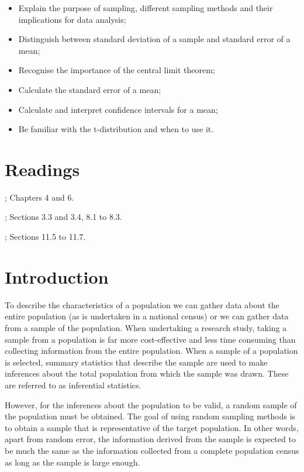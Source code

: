 \documentclass[
]{memoir}
\providecommand{\tightlist}{%
  \setlength{\itemsep}{0pt}\setlength{\parskip}{0pt}}
\begin{document}
\begin{itemize}
\tightlist
\item
  Explain the purpose of sampling, different sampling methods and their implications for data analysis;
\item
  Distinguish between standard deviation of a sample and standard error of a mean;
\item
  Recognise the importance of the central limit theorem;
\item
  Calculate the standard error of a mean;
\item
  Calculate and interpret confidence intervals for a mean;
\item
  Be familiar with the t-distribution and when to use it.
\end{itemize}

\hypertarget{readings-2}{%
\section*{Readings}\label{readings-2}}

\citet{kirkwood_sterne01}; Chapters 4 and 6.

\citet{bland15}; Sections 3.3 and 3.4, 8.1 to 8.3.

\citet{juul_frydenberg14}; Sections 11.5 to 11.7.

\hypertarget{introduction-1}{%
\section{Introduction}\label{introduction-1}}

To describe the characteristics of a population we can gather data about the entire population (as is undertaken in a national census) or we can gather data from a sample of the population. When undertaking a research study, taking a sample from a population is far more cost-effective and less time consuming than collecting information from the entire population. When a sample of a population is selected, summary statistics that describe the sample are used to make inferences about the total population from which the sample was drawn. These are referred to as inferential statistics.

However, for the inferences about the population to be valid, a random sample of the population must be obtained. The goal of using random sampling methods is to obtain a sample that is representative of the target population. In other words, apart from random error, the information derived from the sample is expected to be much the same as the information collected from a complete population census as long as the sample is large enough.
\end{document}
